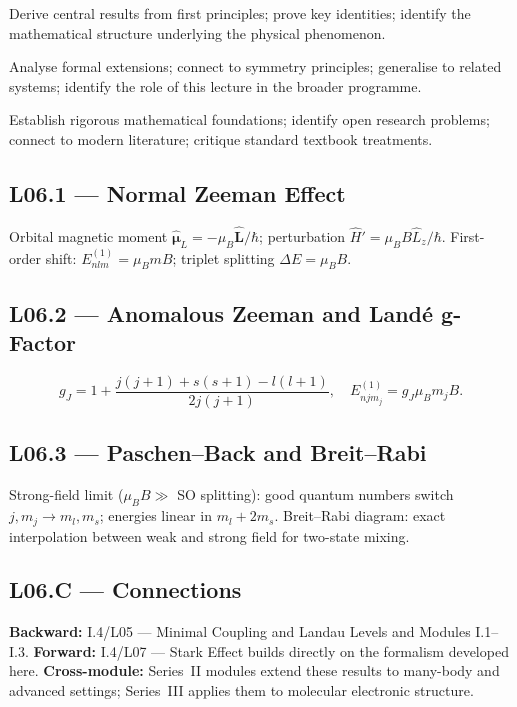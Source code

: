 \quad
Derive central results from first principles; prove key identities; identify
the mathematical structure underlying the physical phenomenon.

\quad
Analyse formal extensions; connect to symmetry principles; generalise to
related systems; identify the role of this lecture in the broader programme.

\quad
Establish rigorous mathematical foundations; identify open research problems;
connect to modern literature; critique standard textbook treatments.


\subsection*{L06.1 — Normal Zeeman Effect}
Orbital magnetic moment $\hat{\boldsymbol\mu}_L = -\mu_B\hat{\mathbf{L}}/\hbar$;
perturbation $\hat{H}'=\mu_B B\hat{L}_z/\hbar$.
First-order shift: $E^{(1)}_{nlm} = \mu_B m B$; triplet splitting $\Delta E = \mu_B B$.

\subsection*{L06.2 — Anomalous Zeeman and Land\'e g-Factor}
\begin{tcolorbox}[lecturebox, title={Landé g-Factor}]
\begin{equation}
  g_J = 1 + \frac{j(j+1)+s(s+1)-l(l+1)}{2j(j+1)},
  \quad E^{(1)}_{njm_j} = g_J\mu_B m_j B.
  \label{eq:L06.1}
\end{equation}
\end{tcolorbox}

\subsection*{L06.3 — Paschen–Back and Breit–Rabi}
Strong-field limit ($\mu_B B \gg$ SO splitting): good quantum numbers switch
$j,m_j \to m_l,m_s$; energies linear in $m_l + 2m_s$.
Breit–Rabi diagram: exact interpolation between weak and strong field for
two-state mixing.


\subsection*{L06.C — Connections}
\label{sec:L06.C}
\textbf{Backward:} I.4/L05 — Minimal Coupling and Landau Levels and Modules I.1–I.3.
\textbf{Forward:} I.4/L07 — Stark Effect builds directly on the formalism developed here.
\textbf{Cross-module:} Series~II modules extend these results to many-body and
advanced settings; Series~III applies them to molecular electronic structure.

